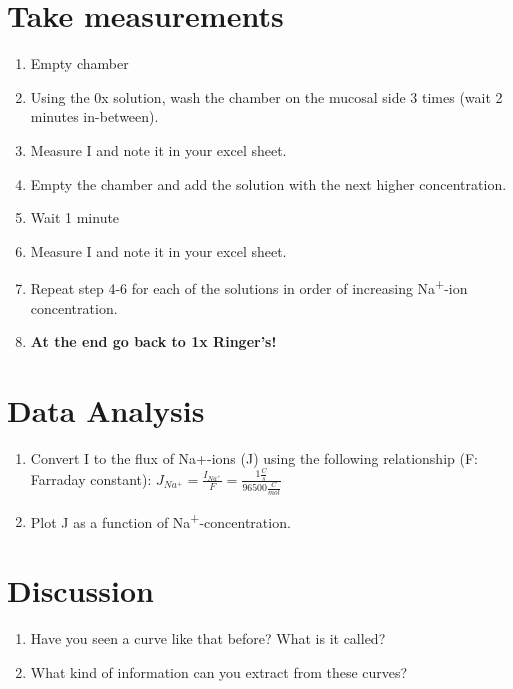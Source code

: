 \documentclass[
]{book}
\begin{document}
\section{Take measurements}\label{take-measurements-1}

\begin{enumerate}
\def\labelenumi{\arabic{enumi}.}
\item
  Empty chamber
\item
  Using the 0x solution, wash the chamber on the mucosal side 3 times (wait 2 minutes in-between).
\item
  Measure I and note it in your excel sheet.
\item
  Empty the chamber and add the solution with the next higher concentration.
\item
  Wait 1 minute
\item
  Measure I and note it in your excel sheet.
\item
  Repeat step 4-6 for each of the solutions in order of increasing Na\textsuperscript{+}-ion concentration.
\item
  \textbf{At the end go back to 1x Ringer's!}
\end{enumerate}

\section{Data Analysis}\label{data-analysis-1}

\begin{enumerate}
\def\labelenumi{\arabic{enumi}.}
\item
  Convert I to the flux of Na+-ions (J) using the following relationship (F: Farraday constant):
  \(J_{Na^+} = \frac {I_{Na^+}}{F} = \frac {1\frac {C} {s}} {96500 \frac {C} {mol}}\)
\item
  Plot J as a function of Na\textsuperscript{+}-concentration.
\end{enumerate}

\section{Discussion}\label{discussion-1}

\begin{enumerate}
\def\labelenumi{\arabic{enumi}.}
\item
  Have you seen a curve like that before? What is it called?
\item
  What kind of information can you extract from these curves?
\end{enumerate}
\end{document}
